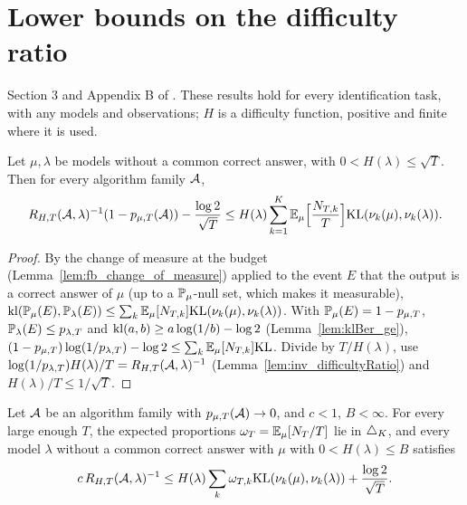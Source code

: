 \chapter{Lower bounds on the difficulty ratio}
\label{chap:lower}

Section 3 and Appendix B of \cite{D23}. These results hold for every identification task, with
any models and observations; $H$ is a difficulty function, positive and finite where it is used.

\begin{theorem}[{\cite[Theorem 2]{D23}}]
  \label{thm:R_LB}
  \leanok
  Let $\mu, \lambda$ be models without a common correct answer, with $0 < H(\lambda) \le \sqrt T$.
  Then for every algorithm family $\mathcal{A}$,
  \[ R_{H,T}(\mathcal{A}, \lambda)^{-1} (1 - p_{\mu,T}(\mathcal{A})) - \frac{\log 2}{\sqrt T}
    \le H(\lambda) \sum_{k=1}^K \mathbb{E}_{\mu}\Bigl[\frac{N_{T,k}}{T}\Bigr] \mathrm{KL}(\nu_k(\mu), \nu_k(\lambda)). \]
\end{theorem}

\begin{proof}
  \leanok
  By the change of measure at the budget (Lemma~\ref{lem:fb_change_of_measure}) applied to the
  event $E$ that the output is a correct answer of $\mu$ (up to a $\mathbb{P}_{\mu}$-null set, which
  makes it measurable),
  $\mathrm{kl}(\mathbb{P}_{\mu}(E), \mathbb{P}_{\lambda}(E)) \le \sum_k \mathbb{E}_{\mu}[N_{T,k}] \mathrm{KL}(\nu_k(\mu), \nu_k(\lambda))$.
  With $\mathbb{P}_{\mu}(E) = 1 - p_{\mu,T}$, $\mathbb{P}_{\lambda}(E) \le p_{\lambda,T}$ and
  $\mathrm{kl}(a, b) \ge a \log(1/b) - \log 2$ (Lemma~\ref{lem:klBer_ge}),
  $(1 - p_{\mu,T}) \log(1/p_{\lambda,T}) - \log 2 \le \sum_k \mathbb{E}_{\mu}[N_{T,k}] \mathrm{KL}$. Divide by
  $T / H(\lambda)$, use $\log(1/p_{\lambda,T}) H(\lambda) / T = R_{H,T}(\mathcal{A}, \lambda)^{-1}$
  (Lemma~\ref{lem:inv_difficultyRatio}) and $H(\lambda) / T \le 1 / \sqrt T$.
\end{proof}

\begin{lemma}
  \label{lem:R_LB_eventually}
  \leanok
  Let $\mathcal{A}$ be an algorithm family with $p_{\mu,T}(\mathcal{A}) \to 0$, and $c < 1$, $B < \infty$. For
  every large enough $T$, the expected proportions $\omega_T = \mathbb{E}_{\mu}[N_T / T]$ lie in
  $\triangle_K$, and every model $\lambda$ without a common correct answer with $\mu$ with
  $0 < H(\lambda) \le B$ satisfies
  \[ c \, R_{H,T}(\mathcal{A}, \lambda)^{-1} \le H(\lambda) \sum_k \omega_{T,k} \mathrm{KL}(\nu_k(\mu),
    \nu_k(\lambda)) + \frac{\log 2}{\sqrt T}. \]
\end{lemma}

